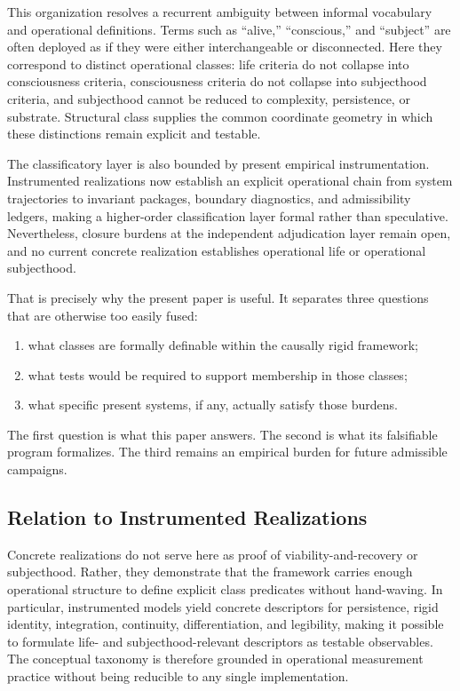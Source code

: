 \documentclass[11pt,a4paper]{article}
\theoremstyle{definition}
\begin{document}
This organization resolves a recurrent ambiguity between informal vocabulary and operational definitions. Terms such as ``alive,'' ``conscious,'' and ``subject'' are often deployed as if they were either interchangeable or disconnected. Here they correspond to distinct operational classes: life criteria do not collapse into consciousness criteria, consciousness criteria do not collapse into subjecthood criteria, and subjecthood cannot be reduced to complexity, persistence, or substrate. Structural class supplies the common coordinate geometry in which these distinctions remain explicit and testable.

The classificatory layer is also bounded by present empirical instrumentation. Instrumented realizations now establish an explicit operational chain from system trajectories to invariant packages, boundary diagnostics, and admissibility ledgers, making a higher-order classification layer formal rather than speculative. Nevertheless, closure burdens at the independent adjudication layer remain open, and no current concrete realization establishes operational life or operational subjecthood.

That is precisely why the present paper is useful. It separates three questions that are otherwise too easily fused:
\begin{enumerate}[leftmargin=1.5em]
\item what classes are formally definable within the causally rigid framework;
\item what tests would be required to support membership in those classes;
\item what specific present systems, if any, actually satisfy those burdens.
\end{enumerate}
The first question is what this paper answers. The second is what its falsifiable program formalizes. The third remains an empirical burden for future admissible campaigns.

\subsection{Relation to Instrumented Realizations}
Concrete realizations do not serve here as proof of viability-and-recovery or subjecthood. Rather, they demonstrate that the framework carries enough operational structure to define explicit class predicates without hand-waving. In particular, instrumented models yield concrete descriptors for persistence, rigid identity, integration, continuity, differentiation, and legibility, making it possible to formulate life- and subjecthood-relevant descriptors as testable observables. The conceptual taxonomy is therefore grounded in operational measurement practice without being reducible to any single implementation.
\end{document}
